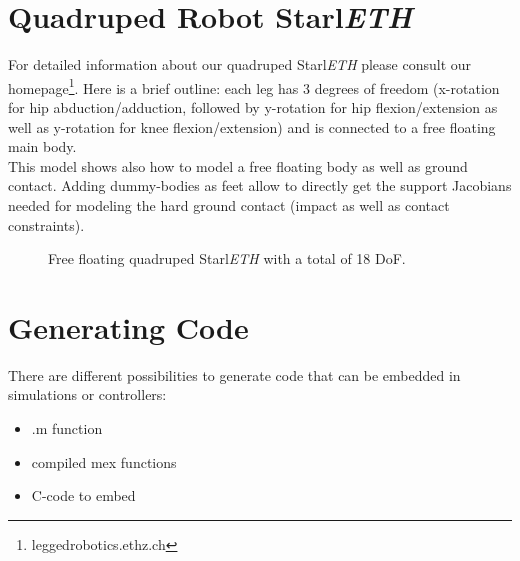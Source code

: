 \section{Quadruped Robot Starl\textit{ETH}}\label{sec:quadruped}
For detailed information about our quadruped Starl\textit{ETH} please consult our homepage\footnote{leggedrobotics.ethz.ch}.  Here is a brief outline: each leg has 3 degrees of freedom (x-rotation for hip abduction/adduction, followed by y-rotation for hip flexion/extension as well as y-rotation for knee flexion/extension) and is connected to a free floating main body.
\\
This model shows also how to model a free floating body as well as ground contact.  Adding dummy-bodies as feet allow to directly get the support Jacobians needed for modeling the hard ground contact (impact as well as contact constraints).
\begin{figure} [H]
	\centering
		\qquad
	\caption{Free floating quadruped Starl\textit{ETH} with a total of 18 DoF.}
	\label{fig:quadruped}
\end{figure}






\clearpage
\section{Generating Code} \label{sec:code}
There are different possibilities to generate code that can be embedded in simulations or controllers:
\begin{itemize}
\item .m function
\item compiled mex functions
\item C-code to embed
\end{itemize}

